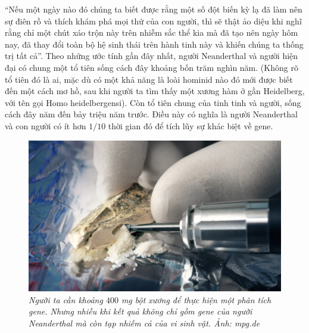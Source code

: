 \begin{multicols}{2}
	\vskip 0.1cm
	“Nếu một ngày nào đó chúng ta biết được rằng một số đột biến kỳ lạ đã làm nên sự điên rồ và thích khám phá mọi thứ của con người, thì sẽ thật ảo diệu khi nghĩ rằng chỉ một chút xáo trộn này trên nhiễm sắc thể kia mà đã tạo nên ngày hôm nay, đã thay đổi toàn bộ hệ sinh thái trên hành tinh này và khiến chúng ta thống trị tất cả”.
	\vskip 0.2cm
	\vskip 0.2cm
	Theo những ước tính gần đây nhất, người Neanderthal và người hiện đại có chung một tổ tiên sống cách đây khoảng bốn trăm nghìn năm. (Không rõ tổ tiên đó là ai, mặc dù có một khả năng là loài hominid nào đó mới được biết đến một cách mơ hồ, sau khi người ta tìm thấy một xương hàm ở gần Heidelberg, với tên gọi Homo heidelbergensi). Còn tổ tiên chung của tinh tinh và người, sống cách đây năm đến bảy triệu năm trước. Điều này có nghĩa là người Neanderthal và con người có ít hơn $1/10$ thời gian đó để tích lũy sự khác biệt về gene.
	\begin{figure}[H]
		\vspace*{-5pt}
		\centering
		\captionsetup{labelformat= empty, justification=centering}
		\includegraphics[width= 1\linewidth]{6}
		\caption{\small\textit{\color{timhieukhoahoc}Người ta cần khoảng $400$ mg bột xương để thực hiện một phân tích gene. Nhưng nhiều khi kết quả không chỉ gồm gene của người Neanderthal mà còn tạp nhiễm cả của vi sinh vật. Ảnh: mpg.de}}
		\vspace*{-10pt}
	\end{figure}

\end{multicols}
